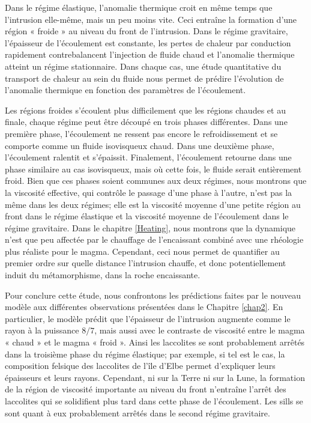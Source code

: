 Dans le régime élastique, l’anomalie thermique croit en même temps que
l’intrusion elle-même, mais un peu moins vite. Ceci entraîne la
formation d’une région « froide » au niveau du front de
l’intrusion. Dans le régime gravitaire, l’épaisseur de l’écoulement
est constante, les pertes de chaleur par conduction rapidement
contrebalancent l’injection de fluide chaud et l’anomalie thermique
atteint un régime stationnaire. Dans chaque cas, une étude
quantitative du transport de chaleur au sein du fluide nous permet de
prédire l’évolution de l’anomalie thermique en fonction des paramètres
de l’écoulement.

Les  régions froides  s’écoulent  plus difficilement  que les  régions
chaudes et au finale, chaque régime  peut être découpé en trois phases
différentes.   Dans une  première phase,  l’écoulement ne  ressent pas
encore le refroidissement  et se comporte comme  un fluide isovisqueux
chaud.    Dans   une   deuxième  phase,   l’écoulement   ralentit   et
s’épaissit. Finalement, l’écoulement retourne dans une phase similaire
au cas isovisqueux,  mais où cette fois, le  fluide serait entièrement
froid.  Bien  que ces  phases soient communes  aux deux  régimes, nous
montrons que  la viscosité  effective, qui  contrôle le  passage d'une
phase à l'autre, n’est pas la même  dans les deux régimes; elle est la
viscosité  moyenne  d’une  petite  région  au  front  dans  le  régime
élastique  et la  viscosité  moyenne de  l’écoulement  dans le  régime
gravitaire.  Dans  le chapitre  \ref{Heating},  nous  montrons que  la
dynamique  n’est que  peu affectée  par le  chauffage de  l’encaissant
combiné avec  une rhéologie  plus réaliste  pour le  magma. Cependant,
ceci nous  permet de quantifier  au premier ordre sur  quelle distance
l'intrusion chauffe, et donc  potentiellement induit du métamorphisme,
dans la roche encaissante.

Pour conclure cette étude, nous confrontons les prédictions faites par
le nouveau modèle aux différentes observations présentées dans le
Chapitre \ref{chap2}. En particulier, le modèle prédit que l’épaisseur
de l’intrusion augmente comme le rayon à la puissance $8/7$, mais
aussi avec le contraste de viscosité entre le magma « chaud » et le
magma « froid ». Ainsi les laccolites se sont probablement arrêtés
dans la troisième phase du régime élastique; par exemple, si tel est
le cas, la composition felsique des laccolites de l’île d’Elbe permet
d’expliquer leurs épaisseurs et leurs rayons. Cependant, ni sur la
Terre ni sur la Lune, la formation de la région de viscosité
importante au niveau du front n’entraîne l'arrêt
des laccolites qui se solidifient plus tard dans cette phase de
l'écoulement. Les sills se sont quant à eux probablement arrêtés dans
le second régime gravitaire.

